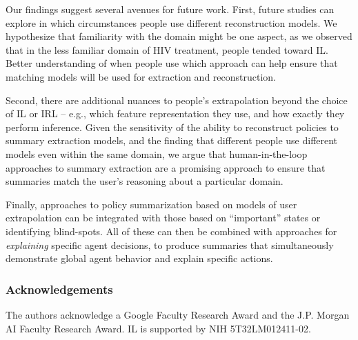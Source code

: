 \documentclass{article}
\begin{document}
Our findings suggest several avenues for future work. First, future studies can explore in which circumstances people use different reconstruction models. We hypothesize that familiarity with the domain might be one aspect, as we observed that in the less familiar domain of HIV treatment, people tended toward IL. Better understanding of when people use which approach can help ensure that matching models will be used for extraction and reconstruction.

Second, there are additional nuances to people's extrapolation beyond the choice of IL or IRL -- e.g., which feature representation they use, and how exactly they perform inference. Given the sensitivity of the ability to reconstruct policies to summary extraction models, and the finding that different people use different models even within the same domain, we argue that human-in-the-loop approaches to summary extraction are a promising approach to ensure that summaries match the user's reasoning about a particular domain.

Finally, approaches to policy summarization based on models of user extrapolation can be integrated with those based on ``important'' states or identifying blind-spots. All of these can then be combined with approaches for \emph{explaining} specific agent decisions, to produce summaries that simultaneously demonstrate global agent behavior and explain specific actions. 

\subsubsection{Acknowledgements} 
The authors acknowledge a Google Faculty Research Award and the J.P. Morgan AI Faculty Research Award. IL is supported by NIH 5T32LM012411-02.

\small


\end{document}
